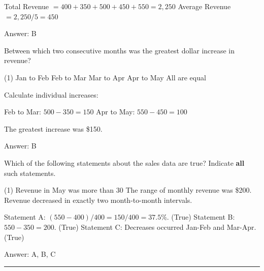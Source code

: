 \documentclass[11pt,paper=a4,answers]{exam}
\begin{document}
\begin{questions}
\begin{solution}
\begin{center}
Total Revenue $= 400 + 350 + 500 + 450 + 550 = 2,250$
\vspace{5pt}
Average Revenue $= 2,250 / 5 = 450$
\end{center}

Answer: \colorbox{yellow!100}{B}
\end{solution}

\vspace{1cm}

\question
Between which two consecutive months was the greatest dollar increase in revenue?

\begin{tasks}(1)
\task[A)] Jan to Feb \task[B)] Feb to Mar \task[C)] Mar to Apr \task[D)] Apr to May \task[E)] All are equal
\end{tasks}

\begin{solution}
Calculate individual increases:
\vspace{5pt}
\begin{center}
Feb to Mar: $500 - 350 = 150$
\vspace{5pt}
Apr to May: $550 - 450 = 100$
\end{center}
The greatest increase was \$150.

Answer: \colorbox{yellow!100}{B}
\end{solution}

\vspace{1cm}

\question
Which of the following statements about the sales data are true?
Indicate \textbf{all} such statements.

\begin{tasks}(1)
\task[A)] Revenue in May was more than 30%
\task[B)] The range of monthly revenue was \$200.
\task[C)] Revenue decreased in exactly two month-to-month intervals.
\end{tasks}

\begin{solution}
\begin{center}
Statement A: $(550 - 400) / 400 = 150 / 400 = 37.5\%$. (True)
\vspace{5pt}
Statement B: $550 - 350 = 200$. (True)
\vspace{5pt}
Statement C: Decreases occurred Jan-Feb and Mar-Apr. (True)
\end{center}

Answer: \colorbox{yellow!100}{A, B, C}
\end{solution}


\end{questions}
\begin{center}
\rule{.5\textwidth}{1pt}
\end{center}
\end{document}
